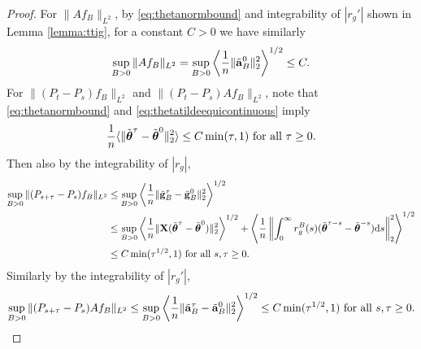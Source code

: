 \begin{proof}
For $\|Af_B\|_{L^2}$,
by \eqref{eq:thetanormbound} and integrability of $|r_g'|$ shown in
Lemma \ref{lemma:ttig}, for a constant $C>0$ we have similarly
\begin{align}\label{eq:IIBbound}
\sup_{B>0} \|Af_B\|_{L^2}
=\sup_{B>0} \left\langle \frac{1}{n}\|\tilde {\mathbf{a}}_B^0\|_2^2
\right\rangle^{1/2} \leq C.
\end{align}
For $\|(P_t-P_s)f_B\|_{L^2}$ and $\|(P_t-P_s)Af_B\|_{L^2}$,
note that \eqref{eq:thetanormbound}
and \eqref{eq:thetatildeequicontinuous} imply
\begin{equation}\label{eq:thetacont}
\frac{1}{n}\langle \|\tilde {\boldsymbol{\theta}}^\tau-\tilde{\boldsymbol{\theta}}^0\|_2^2
\rangle\leq C\min(\tau,1) \text{ for all } \tau \geq 0.
\end{equation}
Then also by the integrability of $|r_g|$,
\begin{align}\label{eq:IIIBgbound}
\sup_{B>0} \|(P_{s+\tau}-P_s)f_B\|_{L^2}
&\leq \sup_{B>0} \left\langle\frac{1}{n}\|\tilde{\mathbf{g}}_B^{\tau}-\tilde{\mathbf{g}}_B^0\|_2^2
\right\rangle^{1/2}\notag\\
&\leq \sup_{B>0}
\left\langle \frac{1}{n}\|\mathbf{X}(\tilde{\boldsymbol{\theta}}^\tau-\tilde{\boldsymbol{\theta}}^0)\|_2^2
\right\rangle^{1/2}
+\left\langle\frac{1}{n}\left\|\int_0^\infty r_g^B(s)(\tilde {\boldsymbol{\theta}}^{\tau-s}
-\tilde{\boldsymbol{\theta}}^{-s})\mathrm{d} s \right\|_2^2 \right\rangle^{1/2}\notag\\
&\leq C\min(\tau^{1/2},1) \text{ for all } s,\tau \geq 0.
\end{align}
Similarly by the integrability of $|r_g'|$,
\begin{equation}\label{eq:IIIBabound}
\sup_{B>0} \|(P_{s+\tau}-P_s)Af_B\|_{L^2}
\leq \sup_{B>0} \left\langle\frac{1}{n}\|\tilde{\mathbf{a}}_B^{\tau}-\tilde{\mathbf{a}}_B^0\|_2^2
\right\rangle^{1/2}
\leq C\min(\tau^{1/2},1) \text{ for all } s,\tau \geq 0.
\end{equation}


\end{proof}
